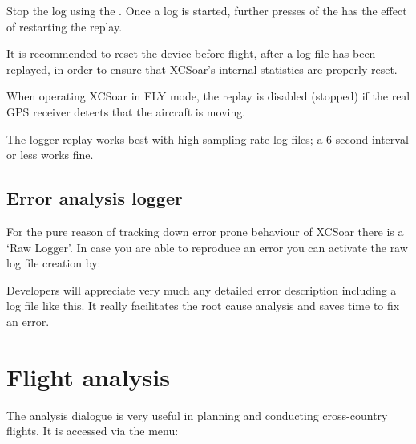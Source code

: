 Stop the log using the .
Once a log is started, further presses of the  has the
effect of restarting the replay.

\tip It is recommended to reset the device before flight, after a log
file has been replayed, in order to ensure that XCSoar's internal
statistics are properly reset.

When operating XCSoar in FLY mode, the replay is disabled (stopped) if
the real GPS receiver detects that the aircraft is moving.

The logger replay works best with high sampling rate log files;
a 6 second interval or less works fine.

\subsection*{Error analysis logger}\label{sec:raw-logger}
For the pure reason of tracking down error prone behaviour of XCSoar 
there is a `Raw Logger'. In case you are able to reproduce an error you can 
activate the raw log file creation by:
\begin{quote}
\blink{}
\end{quote}
Developers will appreciate very much any detailed error description including a log file like this. It really facilitates the root cause analysis and saves time to fix an error.

\section{Flight analysis} \label{sec:analysis-climb}

The analysis dialogue is very useful in planning and conducting
cross-country flights.  It is accessed via the menu:  
\begin{quote}
\blink{}
\end{quote}

